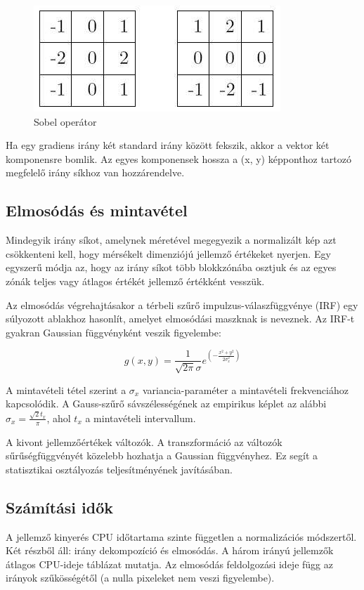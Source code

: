 \begin{figure}[h]
\centering
\includegraphics[scale=0.5]{images/sobel_operator}
\caption{Sobel operátor}
\label{fig:sobel_operator}
\end{figure}

Ha egy gradiens irány két standard irány között fekszik, akkor a vektor két komponensre bomlik. Az egyes komponensek hossza a (x, y) képponthoz tartozó megfelelő irány síkhoz van hozzárendelve.

\subsection{Elmosódás és mintavétel}

Mindegyik irány síkot, amelynek méretével megegyezik a normalizált kép azt csökkenteni kell, hogy mérsékelt dimenziójú jellemző értékeket nyerjen. Egy egyszerű módja az, hogy az irány síkot több blokkzónába osztjuk és az egyes zónák teljes vagy átlagos értékét jellemző értékként vesszük.

Az elmosódás végrehajtásakor a térbeli szűrő impulzus-válaszfüggvénye (IRF) egy súlyozott ablakhoz hasonlít, amelyet elmosódási maszknak is neveznek. Az IRF-t gyakran Gaussian függvényként veszik figyelembe:

$$
g(x,y) = \frac{1}{\sqrt{2\pi}\sigma} e^{{(- \frac{x^2 + y^2}{2 \sigma_x^2})}}
$$

A mintavételi tétel szerint a $\sigma_x$ variancia-paraméter a mintavételi frekvenciához kapcsolódik. A Gauss-szűrő sávszélességének az empirikus képlet az alábbi $\sigma_x = \frac{\sqrt{2}t_x}{\pi}$, ahol $t_x$ a mintavételi intervallum.

A kivont jellemzőértékek változók. A transzformáció az változók sűrűségfüggvényét közelebb hozhatja a Gaussian függvényhez. Ez segít a statisztikai osztályozás teljesítményének javításában.

\subsection{Számítási idők}
A jellemző kinyerés CPU időtartama szinte független a normalizációs módszertől. Két részből áll: irány dekompozíció és elmosódás. A három irányú jellemzők átlagos CPU-ideje
 táblázat mutatja. Az elmosódás feldolgozási ideje függ az irányok szűkösségétől (a nulla pixeleket nem veszi figyelembe).

